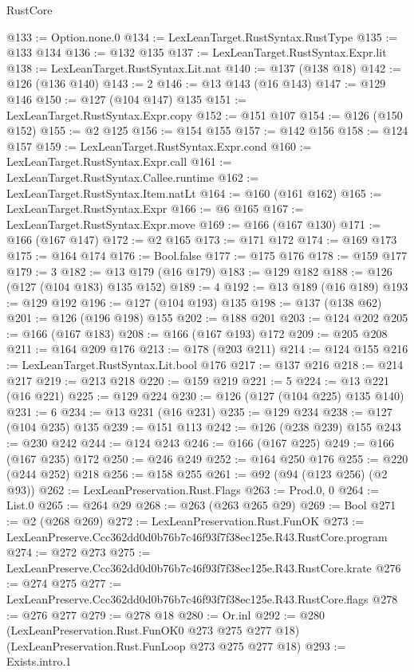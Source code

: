 \begin{lexlean}{RustCore}
\begin{coremodule}
@133 := Option.none.{0}
@134 := LexLeanTarget.RustSyntax.RustType
@135 := @133 @134
@136 := @132 @135
@137 := LexLeanTarget.RustSyntax.Expr.lit
@138 := LexLeanTarget.RustSyntax.Lit.nat
@140 := @137 (@138 @18)
@142 := @126 (@136 @140)
@143 := 2
@146 := @13 @143 (@16 @143)
@147 := @129 @146
@150 := @127 (@104 @147) @135
@151 := LexLeanTarget.RustSyntax.Expr.copy
@152 := @151 @107
@154 := @126 (@150 @152)
@155 := @2 @125
@156 := @154 @155
@157 := @142 @156
@158 := @124 @157
@159 := LexLeanTarget.RustSyntax.Expr.cond
@160 := LexLeanTarget.RustSyntax.Expr.call
@161 := LexLeanTarget.RustSyntax.Callee.runtime
@162 := LexLeanTarget.RustSyntax.Item.natLt
@164 := @160 (@161 @162)
@165 := LexLeanTarget.RustSyntax.Expr
@166 := @6 @165
@167 := LexLeanTarget.RustSyntax.Expr.move
@169 := @166 (@167 @130)
@171 := @166 (@167 @147)
@172 := @2 @165
@173 := @171 @172
@174 := @169 @173
@175 := @164 @174
@176 := Bool.false
@177 := @175 @176
@178 := @159 @177
@179 := 3
@182 := @13 @179 (@16 @179)
@183 := @129 @182
@188 := @126 (@127 (@104 @183) @135 @152)
@189 := 4
@192 := @13 @189 (@16 @189)
@193 := @129 @192
@196 := @127 (@104 @193) @135
@198 := @137 (@138 @62)
@201 := @126 (@196 @198) @155
@202 := @188 @201
@203 := @124 @202
@205 := @166 (@167 @183)
@208 := @166 (@167 @193) @172
@209 := @205 @208
@211 := @164 @209 @176
@213 := @178 (@203 @211)
@214 := @124 @155
@216 := LexLeanTarget.RustSyntax.Lit.bool @176
@217 := @137 @216
@218 := @214 @217
@219 := @213 @218
@220 := @159 @219
@221 := 5
@224 := @13 @221 (@16 @221)
@225 := @129 @224
@230 := @126 (@127 (@104 @225) @135 @140)
@231 := 6
@234 := @13 @231 (@16 @231)
@235 := @129 @234
@238 := @127 (@104 @235) @135
@239 := @151 @113
@242 := @126 (@238 @239) @155
@243 := @230 @242
@244 := @124 @243
@246 := @166 (@167 @225)
@249 := @166 (@167 @235) @172
@250 := @246 @249
@252 := @164 @250 @176
@255 := @220 (@244 @252) @218
@256 := @158 @255
@261 := @92 (@94 (@123 @256) (@2 @93))
@262 := LexLeanPreservation.Rust.Flags
@263 := Prod.{0, 0}
@264 := List.{0}
@265 := @264 @29
@268 := @263 (@263 @265 @29)
@269 := Bool
@271 := @2 (@268 @269)
@272 := LexLeanPreservation.Rust.FunOK
@273 := LexLeanPreserve.Ccc362dd0d0b76b7c46f93f7f38ec125e.R43.RustCore.program
@274 := @272 @273
@275 := LexLeanPreserve.Ccc362dd0d0b76b7c46f93f7f38ec125e.R43.RustCore.krate
@276 := @274 @275
@277 := LexLeanPreserve.Ccc362dd0d0b76b7c46f93f7f38ec125e.R43.RustCore.flags
@278 := @276 @277
@279 := @278 @18
@280 := Or.inl
@292 := @280
    (LexLeanPreservation.Rust.FunOK0 @273 @275 @277 @18)
    (LexLeanPreservation.Rust.FunLoop @273 @275 @277 @18)
@293 := Exists.intro.{1}

\end{coremodule}
\end{lexlean}
